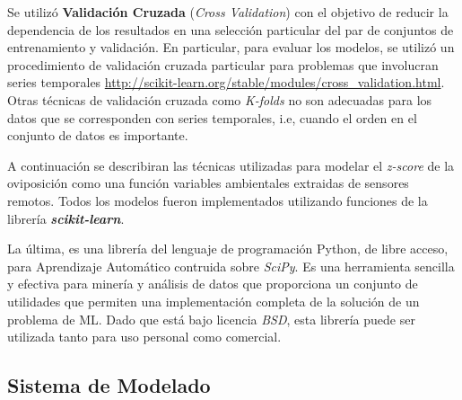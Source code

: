  \par Se utilizó \textbf{Validación Cruzada}
    (\textit{Cross Validation}) \cite{cross_validation, ml_rainfall} con el
    objetivo de reducir la dependencia de los resultados en una selección particular
    del par de conjuntos de entrenamiento y validación. En particular, para
    evaluar los modelos, se utilizó un procedimiento de validación cruzada
    particular para problemas que involucran series temporales
    \url{http://scikit-learn.org/stable/modules/cross_validation.html}.
    Otras técnicas de validación cruzada como \textit{K-folds} no son
    adecuadas para los datos que se corresponden con series temporales, i.e,
    cuando el orden en el conjunto de datos es importante.

    \par A continuación se describiran las técnicas utilizadas para modelar
    el \textit{z-score} de la oviposición como una función variables ambientales
    extraidas de sensores remotos. Todos los modelos fueron implementados utilizando
    funciones de la librería \textbf{\textit{scikit-learn}}.

    \par La última, es una librería del lenguaje de programación Python, de libre
    acceso, para Aprendizaje Automático contruida sobre \textit{SciPy}\cite{scipy}.
    Es una herramienta sencilla y efectiva para minería y análisis de datos que
    proporciona un conjunto de utilidades que permiten una implementación
    completa de la solución de un problema de ML.
    Dado que está bajo licencia \textit{BSD}, esta librería puede ser utilizada
    tanto para uso personal como comercial.


    \subsection{Sistema de Modelado}

